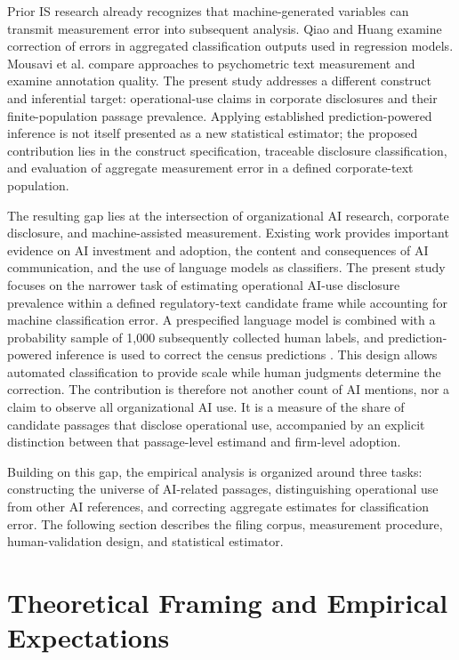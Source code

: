 \documentclass[12pt]{article}
\begin{document}
Prior IS research already recognizes that machine-generated variables can
transmit measurement error into subsequent analysis. Qiao and Huang
\citep{qiao2025measurement} examine correction of errors in aggregated
classification outputs used in regression models. Mousavi et al.
\citep{mousavi2026psychometric} compare approaches to psychometric text
measurement and examine annotation quality. The present study addresses a
different construct and inferential target: operational-use claims in corporate
disclosures and their finite-population passage prevalence. Applying established
prediction-powered inference is not itself presented as a new statistical
estimator; the proposed contribution lies in the construct specification,
traceable disclosure classification, and evaluation of aggregate measurement
error in a defined corporate-text population.

The resulting gap lies at the intersection of organizational AI research,
corporate disclosure, and machine-assisted measurement. Existing work provides
important evidence on AI investment and adoption, the content and consequences
of AI communication, and the use of language models as classifiers. The present study focuses on the narrower task of estimating operational
AI-use disclosure prevalence within a defined regulatory-text candidate frame
while accounting for machine classification error. A prespecified language model is combined
with a probability sample of 1,000 subsequently collected human labels, and
prediction-powered inference is used to correct the census predictions
\citep{angelopoulos2023ppi}. This design allows automated classification to
provide scale while human judgments determine the correction. The contribution
is therefore not another count of AI mentions, nor a claim to observe all
organizational AI use. It is a measure of the share of candidate passages that disclose operational
use, accompanied by an explicit distinction between that passage-level estimand
and firm-level adoption.

Building on this gap, the empirical analysis is organized around three tasks:
constructing the universe of AI-related passages, distinguishing operational
use from other AI references, and correcting aggregate estimates for
classification error. The following section describes the filing corpus,
measurement procedure, human-validation design, and statistical estimator.

\section{Theoretical Framing and Empirical Expectations}
\end{document}
